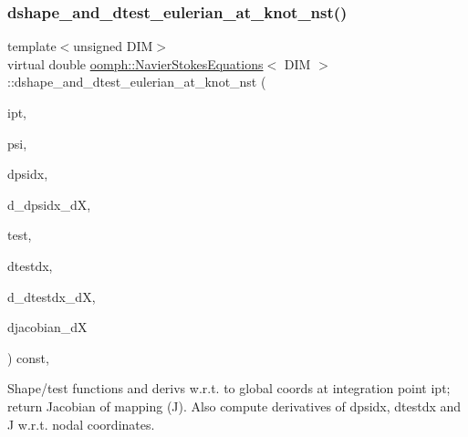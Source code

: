 \mbox{\label{classoomph_1_1NavierStokesEquations_afbc63afd804f5143c74b0ca1be76ef82}} 
\subsubsection{\texorpdfstring{dshape\+\_\+and\+\_\+dtest\+\_\+eulerian\+\_\+at\+\_\+knot\+\_\+nst()}{dshape\_and\_dtest\_eulerian\_at\_knot\_nst()}\hspace{0.1cm}{\footnotesize\ttfamily [2/2]}}
{\footnotesize\ttfamily template$<$unsigned D\+IM$>$ \\
virtual double \hyperlink{classoomph_1_1NavierStokesEquations}{oomph\+::\+Navier\+Stokes\+Equations}$<$ D\+IM $>$\+::dshape\+\_\+and\+\_\+dtest\+\_\+eulerian\+\_\+at\+\_\+knot\+\_\+nst (\begin{DoxyParamCaption}\item[{const unsigned \&}]{ipt,  }\item[{\hyperlink{classoomph_1_1Shape}{Shape} \&}]{psi,  }\item[{\hyperlink{classoomph_1_1DShape}{D\+Shape} \&}]{dpsidx,  }\item[{\hyperlink{classoomph_1_1RankFourTensor}{Rank\+Four\+Tensor}$<$ double $>$ \&}]{d\+\_\+dpsidx\+\_\+dX,  }\item[{\hyperlink{classoomph_1_1Shape}{Shape} \&}]{test,  }\item[{\hyperlink{classoomph_1_1DShape}{D\+Shape} \&}]{dtestdx,  }\item[{\hyperlink{classoomph_1_1RankFourTensor}{Rank\+Four\+Tensor}$<$ double $>$ \&}]{d\+\_\+dtestdx\+\_\+dX,  }\item[{\hyperlink{classoomph_1_1DenseMatrix}{Dense\+Matrix}$<$ double $>$ \&}]{djacobian\+\_\+dX }\end{DoxyParamCaption}) const\hspace{0.3cm}{\ttfamily [protected]}, {}}



Shape/test functions and derivs w.\+r.\+t. to global coords at integration point ipt; return Jacobian of mapping (J). Also compute derivatives of dpsidx, dtestdx and J w.\+r.\+t. nodal coordinates. 



